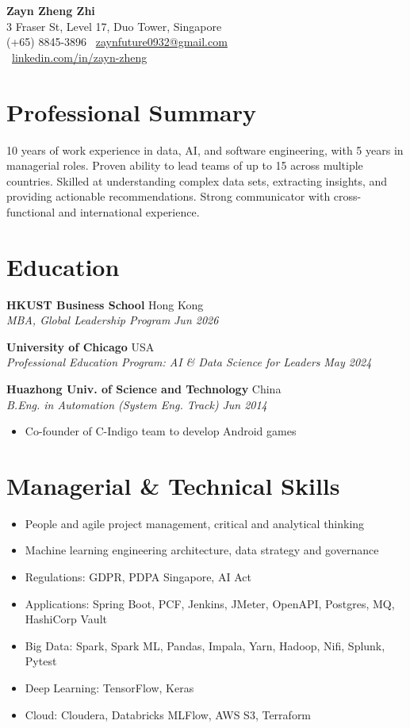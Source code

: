 \documentclass[a4paper,11pt]{article}
\newcommand{\resumeSubheading}[4]{
  \vspace{1pt}\textbf{#1} \hfill #2 \\
  \textit{#3} \hfill \textit{#4}\vspace{2pt}
}
\begin{document}
\begin{center}
    {\LARGE \textbf{Zayn Zheng Zhi}} \\[4pt]
    3 Fraser St, Level 17, Duo Tower, Singapore \\
    (+65) 8845-3896 \quad \faEnvelope\ \href{mailto:zaynfuture0932@gmail.com}{zaynfuture0932@gmail.com} \\
    \faLinkedin\ \href{https://www.linkedin.com/in/zayn-zheng/}{linkedin.com/in/zayn-zheng}
\end{center}

\section*{Professional Summary}
10 years of work experience in data, AI, and software engineering, with 5 years in managerial roles. Proven ability to lead teams of up to 15 across multiple countries. Skilled at understanding complex data sets, extracting insights, and providing actionable recommendations. Strong communicator with cross-functional and international experience.

\section*{Education}
\resumeSubheading{HKUST Business School}{Hong Kong}{MBA, Global Leadership Program}{Jun 2026}
\resumeSubheading{University of Chicago}{USA}{Professional Education Program: AI \& Data Science for Leaders}{May 2024}
\resumeSubheading{Huazhong Univ. of Science and Technology}{China}{B.Eng. in Automation (System Eng. Track)}{Jun 2014}
\begin{itemize}[leftmargin=*]
  \item Co-founder of C-Indigo team to develop Android games
\end{itemize}

\section*{Managerial \& Technical Skills}
\begin{itemize}[leftmargin=*]
  \item People and agile project management, critical and analytical thinking
  \item Machine learning engineering architecture, data strategy and governance
  \item Regulations: GDPR, PDPA Singapore, AI Act
  \item Applications: Spring Boot, PCF, Jenkins, JMeter, OpenAPI, Postgres, MQ, HashiCorp Vault
  \item Big Data: Spark, Spark ML, Pandas, Impala, Yarn, Hadoop, Nifi, Splunk, Pytest
  \item Deep Learning: TensorFlow, Keras
  \item Cloud: Cloudera, Databricks MLFlow, AWS S3, Terraform
\end{itemize}
\end{document}
